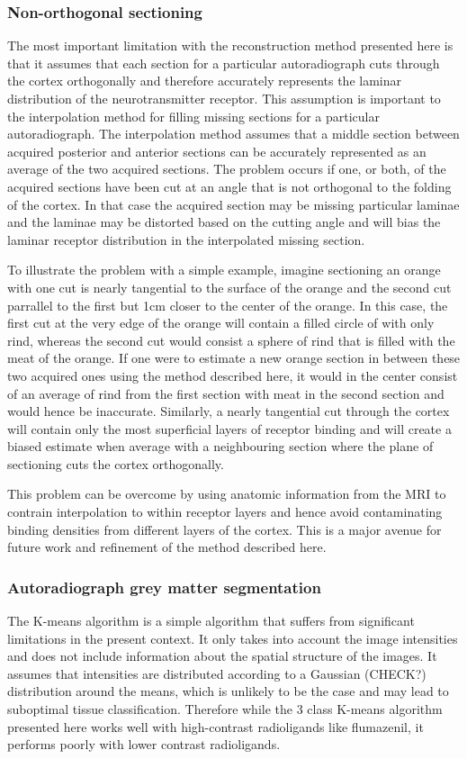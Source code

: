 \documentclass[12pt]{article}
\begin{document}
\subsubsection{Non-orthogonal sectioning}

The most important limitation with the reconstruction method presented here is that it assumes that each section for a particular autoradiograph cuts through the cortex orthogonally and therefore accurately represents the laminar distribution of the neurotransmitter receptor. This assumption is important to the interpolation method for filling  missing sections for a particular autoradiograph. The interpolation method assumes that a middle section between acquired posterior and anterior sections can be accurately represented as an average of the two acquired sections. The problem occurs if one, or both, of the acquired sections have been cut at an angle that is not orthogonal to the folding of the cortex. In that case the acquired section may be missing particular laminae and the laminae may be distorted based on the cutting angle and will bias the laminar receptor distribution in the interpolated missing section. 

To illustrate the problem with a simple example, imagine sectioning an orange with one cut is nearly tangential to the surface of the orange and the second cut parrallel to the first but 1cm closer to the center of the orange. In this case, the first cut at the very edge of the orange will contain  a filled circle of with only rind, whereas the second cut would consist a sphere of rind that is filled with the meat of the orange. If one were to estimate a new orange section in between these two acquired ones using the method described here, it would in the center consist of an average of rind from the first section with meat in the second section and would hence be inaccurate. Similarly, a nearly tangential cut through the cortex will contain only the most superficial layers of receptor binding and will create a biased estimate when average with a neighbouring section where the plane of sectioning cuts the cortex orthogonally.  

This problem can be overcome by using anatomic information from the MRI to contrain interpolation to within receptor layers and hence avoid contaminating binding densities from different layers of the cortex. This is a major avenue for future work and refinement of the method described here. 

\subsubsection{Autoradiograph grey matter segmentation}
The K-means algorithm is a simple algorithm that suffers from significant limitations in the present context. It only takes into account the image intensities and does not include information about the spatial structure of the images. It assumes that intensities are distributed according to a Gaussian (CHECK?) distribution around the means, which is unlikely to be the case and may lead to suboptimal tissue classification. Therefore while the 3 class K-means algorithm presented here works well with high-contrast radioligands like flumazenil, it performs poorly with lower contrast radioligands.
\end{document}
